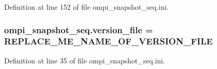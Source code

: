 Definition at line 152 of file ompi\-\_\-snapshot\-\_\-seq.\-ini.

\hypertarget{namespaceompi__snapshot__seq_ab1bd70042bbcbfc640abba12010ed2b5}{
\subsubsection[{version\-\_\-file}]{\setlength{\rightskip}{0pt plus 5cm}ompi\-\_\-snapshot\-\_\-seq.\-version\-\_\-file = R\-E\-P\-L\-A\-C\-E\-\_\-\-M\-E\-\_\-\-N\-A\-M\-E\-\_\-\-O\-F\-\_\-\-V\-E\-R\-S\-I\-O\-N\-\_\-\-F\-I\-L\-E}}\label{namespaceompi__snapshot__seq_ab1bd70042bbcbfc640abba12010ed2b5}


Definition at line 35 of file ompi\-\_\-snapshot\-\_\-seq.\-ini.

